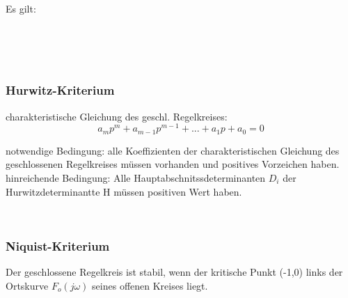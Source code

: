 Es gilt:

\begin{minipage}{0.45\textwidth}

 \\
 \\
 \\

\end{minipage}
\begin{minipage}{0.45\textwidth}

\end{minipage}

\subsubsection{Hurwitz-Kriterium}
charakteristische Gleichung des geschl. Regelkreises:
$$ a_mp^m + a_{m-1}p^{m-1}+ ... + a_1p+ a_0 = 0$$

notwendige Bedingung: alle Koeffizienten der charakteristischen Gleichung des geschlossenen Regelkreises müssen vorhanden und positives Vorzeichen haben. \\

hinreichende Bedingung: Alle Hauptabschnitssdeterminanten $D_i$
der Hurwitzdeterminantte H müssen positiven Wert haben.\\

\begin{minipage}{0.45\textwidth}

 \\
\end{minipage}
\begin{minipage}{0.45\textwidth}

\end{minipage}

\subsubsection{Niquist-Kriterium}
Der geschlossene Regelkreis ist stabil, wenn der kritische Punkt (-1,0) links der Ortskurve $F_o(j\omega)$ seines offenen Kreises liegt.


